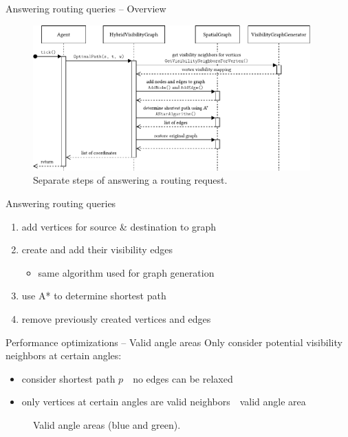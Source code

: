 \documentclass[xcolor={x11names}]{beamer}
\renewcommand{\n}{\hfill\\[0.5ex]}
\newenvironment{figcenter}
{%
	\parskip=0pt%
	\par%
	\nopagebreak%
	\centering%
}%
{%
	\par%
	\noindent%
	\ignorespacesafterend%
}
\begin{document}
		\begin{frame}{Answering routing queries -- Overview}
			\begin{figure}[t]
				\begin{figcenter}
					\includegraphics[width=0.95\textwidth]{images/components-sequence-routing-short.pdf}
				\end{figcenter}
				\caption{Separate steps of answering a routing request.}
			\end{figure}
		\end{frame}
		
		\begin{frame}{Answering routing queries}
			\begin{enumerate}
				\item add vertices for source \& destination to graph
				\item create and add their visibility edges
				\begin{itemize}
					\item[\textrightarrow] same algorithm used for graph generation
				\end{itemize}
				\item use A* to determine shortest path
				\item remove previously created vertices and edges
			\end{enumerate}
		\end{frame}
		
		\begin{frame}{Performance optimizations -- Valid angle areas}
			Only consider potential visibility neighbors at certain angles:\n
			\begin{itemize}
				\item consider shortest path $p$\ \textrightarrow\ no edges can be relaxed
				\item only vertices at certain angles are valid neighbors\ \textrightarrow\ valid angle area
			\end{itemize}
			\begin{figure}[b]
				\begin{figcenter}
					\scalebox{0.7}
					{
						
					}
				\end{figcenter}
				\caption{Valid angle areas (blue and green).}
			\end{figure}
		\end{frame}
		
\end{document}

